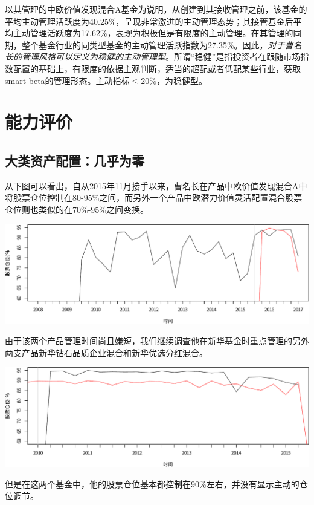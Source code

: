 \documentclass[hyperref,]{ctexart}
\begin{document}
以其管理的中欧价值发现混合A基金为说明，从创建到其接收管理之前，该基金的平均主动管理活跃度为40.25\%，呈现非常激进的主动管理态势；其接管基金后平均主动管理活跃度为17.62\%，表现为积极但是有限度的主动管理。在其管理的同期，整个基金行业的同类型基金的主动管理活跃指数为27.35\%。因此，\emph{对于曹名长的管理风格可以定义为稳健的主动管理型}。所谓``稳健''是指投资者在跟随市场指数配置的基础上，有限度的依据主观判断，适当的超配或者低配某些行业，获取smart
beta的管理形态。主动指标\(\leq 20\%\)，为稳健型。

\section{能力评价}

\subsection{大类资产配置：几乎为零}

从下图可以看出，自从2015年11月接手以来，曹名长在产品中欧价值发现混合A中将股票仓位控制在80-95\%之间，而另外一个产品中欧潜力价值灵活配置混合股票仓位则也类似的在70\%-95\%之间变换。

\includegraphics{caominchang-details_files/figure-latex/unnamed-chunk-13-1.pdf}

由于该两个产品管理时间尚且嫌短，我们继续调查他在新华基金时重点管理的另外两支产品新华钻石品质企业混合和新华优选分红混合。

\includegraphics{caominchang-details_files/figure-latex/unnamed-chunk-14-1.pdf}

但是在这两个基金中，他的股票仓位基本都控制在90\%左右，并没有显示主动的仓位调节。
\end{document}
